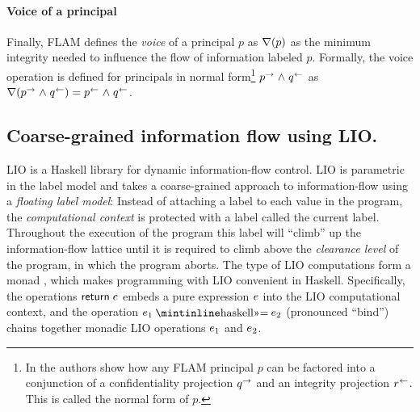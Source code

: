 \paragraph{Voice of a principal}
Finally, FLAM defines the \emph{voice} of a principal $p$ as $\nabla(p)$ as the minimum integrity needed to influence the flow of information labeled $p$. Formally, the voice operation is defined for principals in normal form\footnote{In \cite{Arden:2015:FA:2859845.2859998} the authors show how any FLAM principal $p$ can be factored into a conjunction of a confidentiality projection $q^{\rightarrow}$ and an integrity projection $r^{\leftarrow}$. This is called the normal form of $p$.} $p^{\rightarrow} \mathrel{\land} q^{\leftarrow}$ as $\nabla(p^{\rightarrow} \mathrel{\land} q^{\leftarrow}) = p^{\leftarrow} \mathrel{\land} q^{\leftarrow}$.

\subsection{Coarse-grained information flow using LIO.}
LIO \cite{SRMMlio} is a Haskell library for dynamic information-flow control. LIO is parametric in the label model and takes a coarse-grained approach to information-flow using a \emph{floating label model}: Instead of attaching a label to each value in the program, the \emph{computational context} is protected with a label called the current label. Throughout the execution of the program this label will ``climb'' up the information-flow lattice until it is required to climb above the \emph{clearance level} of the program, in which the program aborts. The type of LIO computations form a monad \cite{Wadler:1995:MFP:647698.734146}, which makes programming with LIO convenient in Haskell. Specifically, the operations $\mathsf{return}\;e$ embeds a pure expression $e$ into the LIO computational context, and the operation $\bind{\expr_1}{\expr_2}$ (pronounced ``bind'') chains together monadic LIO operations $e_1$ and $e_2$.

